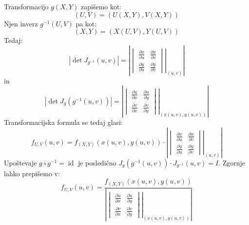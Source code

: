 \documentclass[12pt]{book}
\def\n{\noindent}
\theoremstyle{definition}
\theoremstyle{plain}
\theoremstyle{plain}
\theoremstyle{plain}
\theoremstyle{remark}
\begin{document}
\n Transformacijo $g(X, Y)$ zapišemo kot:
$$
(U, V)=(U(X, Y), V(X, Y))
$$
Njen inverz $g^{-1}(U,V)$ pa kot: 
$$
(X, Y)=(X(U, V), Y(U, V))
$$
Tedaj: 
$$
|\det J_{g^{-1}}(u, v)| = \left\lvert\left.\begin{vmatrix}
    \frac{\partial x}{\partial u} & \frac{\partial x}{\partial v} \\
    \frac{\partial y}{\partial u} & \frac{\partial y}{\partial v}
    \end{vmatrix}\right|_{(u, v)} \right\rvert
$$
in
$$
|\det J_{g}(g^{-1}(u, v))| = \left\lvert\left.\begin{vmatrix}
    \frac{\partial u}{\partial x} & \frac{\partial u}{\partial y} \\
    \frac{\partial v}{\partial x} & \frac{\partial v}{\partial y}
    \end{vmatrix}\right|_{(x(u, v), y(u, v))} \right\rvert
$$
Transformacijska formula se tedaj glasi: 
$$
f_{U, V}(u, v)=f_{(X, Y)}(x(u, v), y(u, v)) \cdot \left\lvert\left.\begin{vmatrix}
    \frac{\partial x}{\partial u} & \frac{\partial x}{\partial v} \\
    \frac{\partial y}{\partial u} & \frac{\partial y}{\partial v}
    \end{vmatrix}\right|_{(u, v)} \right\rvert
$$
Upoštevaje $g \circ g^{-1}=\operatorname{id}$ je posledično $J_g\left(g^{-1}(u, v)\right) \cdot J_{g^{-1}}(u, v)=I$. Zgornje lahko prepišemo v: 
$$
f_{U, V}(u, v)=\frac{f_{(X, Y)}(x(u, v), y(u, v))}{\left\lvert\left.\begin{vmatrix}
    \frac{\partial u}{\partial x} & \frac{\partial u}{\partial y} \\
    \frac{\partial v}{\partial x} & \frac{\partial v}{\partial y}
    \end{vmatrix}\right|_{(x(u, v), y(u, v))} \right\rvert}
$$
\end{document}
